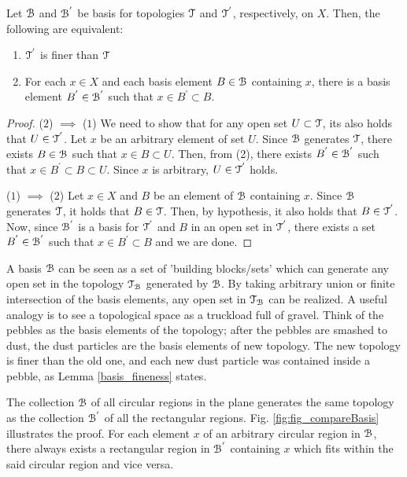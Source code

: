 \documentclass[a4paper,english,12pt]{article}
\begin{document}
\begin{lem} \label{basis_fineness}
 Let $\mathcal{B}$ and $\mathcal{B}^{'}$ be basis for topologies $\mathcal{T}$ and $\mathcal{T}^{'}$, respectively, on $X$. Then, the following are equivalent:
 \begin{enumerate}
  \item $\mathcal{T}^{'}$ is finer than $\mathcal{T}$
  \item For each $x \in X$  and each basis element $B \in \mathcal{B}$ containing $x$, there is a basis element $B^{'} \in \mathcal{B}^{'}$ such that $x \in B^{'} \subset B$.
 \end{enumerate}
\end{lem}
\begin{proof}
 ($2$) $\implies$ ($1$) We need to show that for any open set $U \subset \mathcal{T}$, its also holds that $U \in \mathcal{T}^{'}$. Let $x$ be an arbitrary element of set $U$. Since 
 $\mathcal{B}$ generates $\mathcal{T}$, there exists $B \in \mathcal{B}$ such that $x \in B \subset U$. Then, from (2), there exists $B^{'} \in \mathcal{B}^{'}$ such that $x \in B^{'} \subset B \subset U$.
 Since $x$ is arbitrary, $U \in \mathcal{T}^{'}$ holds. 
 
 ($1$) $\implies$ ($2$) Let $x \in X$ and $B$ be an element of $\mathcal{B}$ containing $x$. Since $\mathcal{B}$ generates $\mathcal{T}$, it holds that $B \in \mathcal{T}$. Then, by hypothesis, it also 
 holds that $B \in \mathcal{T}^{'}$. Now, since $\mathcal{B}^{'}$ is a basis for $\mathcal{T}^{'}$ and $B$ in an open set in $\mathcal{T}^{'}$, there exists a set $B^{'} \in \mathcal{B}^{'}$ such that 
 $x \in B^{'} \subset B$ and we are done.
\end{proof}

A basis $\mathcal{B}$ can be seen as a set of 'building blocks/sets' which can generate any open set in the topology $\mathcal{T}_{\mathcal{B}}$ generated by $\mathcal{B}$. By taking 
arbitrary union or finite intersection of the basis elements, any open set in $\mathcal{T}_{\mathcal{B}}$ can be realized. A useful analogy is to see a topological space 
as a truckload full of gravel. Think of the pebbles as the basis elements of the topology; after the pebbles are smashed to dust, the dust particles are the
basis elements of new topology. The new topology is finer than the old one, and each new dust particle was contained inside a pebble, as Lemma \ref{basis_fineness}
states.

\begin{exmp}
The collection $\mathcal{B}$ of all circular regions in the plane generates the same topology as the collection $\mathcal{B}^{'}$ of all the rectangular regions. Fig. \ref{fig:fig_compareBasis} illustrates the proof. For each element $x$ of an arbitrary circular region in $\mathcal{B}$, there always exists a rectangular region in $\mathcal{B}^{'}$ containing $x$ which fits within the said circular region and vice versa. 
\end{exmp}
\end{document}
